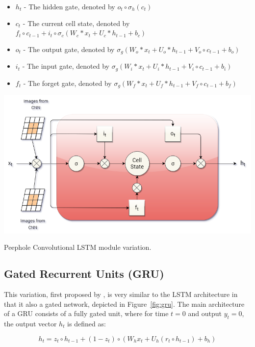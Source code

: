 \begin{itemize}
	\item {$h_{t}$} - The hidden gate, denoted by {$o_{t} \circ \sigma_{h}(c_{t})$}
	\item {$c_{t}$} - The current cell state, denoted by {$f_{t} \circ c_{t-1} + i_{t} \circ \sigma_{c}(W_{c} {\displaystyle *} x_{t} + U_{c} {\displaystyle *} h_{t-1} + b_{c})$}
	\item {$o_{t}$} - The output gate, denoted by {$\sigma_{g}(W_{o} {\displaystyle *} x_{t} + U_{o} {\displaystyle *} h_{t-1} + V_{o} \circ c_{t-1}+ b_{o})$}
	\item {$i_{t}$} - The input gate, denoted by {$\sigma_{g}(W_{i} {\displaystyle *} x_{t} + U_{i} {\displaystyle *} h_{t-1} + V_{i} \circ c_{t-1}+ b_{i})$}
	\item {$f_{t}$} - The forget gate, denoted by {$\sigma_{g}(W_{f} {\displaystyle *} x_{t} + U_{f} {\displaystyle *} h_{t-1} + V_{f} \circ c_{t-1}+ b_{f})$}
\end{itemize}

\begin{marginfigure}
	\centering
	\includegraphics[width=0.6\linewidth]{graphics/lstm/lstm_conv.png}
	\caption{
		Peephole Convolutional LSTM module variation.
	}
	\label{fig:lstm_conv}
\end{marginfigure}

\subsection{Gated Recurrent Units (GRU)}
This variation, first proposed by \citet{cho-al-emnlp14}, is very similar to the LSTM architecture in that it also a gated network, depicted in Figure~\ref{fig:gru}. The main architecture of a GRU consists of a fully gated unit, where for time {$t = 0$} and output {$y_{t} = 0$}, the output vector {$h_{t}$} is defined as:

\begin{equation} \label{GRU transfer function}
	h_{t} = z_{t} \circ h_{t-1} + (1-z_{t}) \circ  (W_{h}x_{t} + U_{h}(r_{t} \circ h_{t-1}) + b_{h})
\end{equation}

